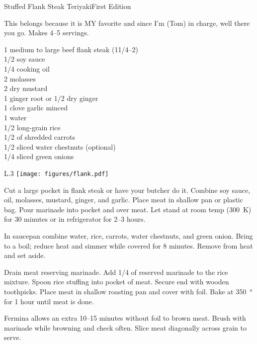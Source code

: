 \begin{entry}{Stuffed Flank Steak Teriyaki}{First Edition}

\begin{open}
  This belongs because it is MY favorite and since I'm (Tom) in charge,
  well there you go.  Makes \numrange{4}{5} servings.
\end{open}
\begin{ingredients}
  1 medium to large beef flank steak (1\SIrange{1/4}{2}{\pound}) \\
  \SI{1/2}{\cup} soy sauce                                    \\
  \SI{1/4}{\cup} cooking oil                                  \\
  \SI{2}{\tblspoon} molasses                                   \\
  \SI{2}{\teaspoon} dry mustard                               \\
  \SI{1}{\teaspoon} ginger root or \SI{1/2}{\teaspoon} dry ginger \\
  1 clove garlic minced                                       \\
  \SI{1}{\cup} water                                          \\
  \SI{1/2}{\cup} long-grain rice                              \\
  \SI{1/2}{\cup} of shredded carrots                          \\
  \SI{1/2}{\cup} sliced water chestnuts (optional)            \\
  \SI{1/4}{\cup} sliced green onions
\end{ingredients}
\begin{wrapfigure}{L}{.3\textwidth}
\centering\texttt{[image: figures/flank.pdf]}
\end{wrapfigure}
Cut a large pocket in flank steak or have your butcher do it.  Combine soy
sauce, oil, molasses, mustard, ginger, and garlic.  Place meat in shallow pan
or plastic bag.  Pour marinade into pocket and over meat. Let stand at room
temp (\SI{300}{\kelvin}) for 30 minutes or in refrigerator for
\numrange{2}{3} hours.

In saucepan combine water, rice, carrots, water chestnuts, and green onion.
Bring to a boil; reduce heat and simmer while covered for 8 minutes.  Remove
from heat and set aside.

Drain meat reserving marinade.  Add \SI{1/4}{\cup} of reserved marinade to the
rice mixture.  Spoon rice stuffing into pocket of meat.  Secure end with
wooden toothpicks.  Place meat in shallow roasting pan and cover with foil.
Bake at \SI{350}{\degree} for 1 hour until meat is done.

Fermina allows an extra \numrange{10}{15} minutes without foil to brown meat.
Brush with marinade while browning and check often.  Slice meat diagonally
across grain to serve.
\end{entry}

